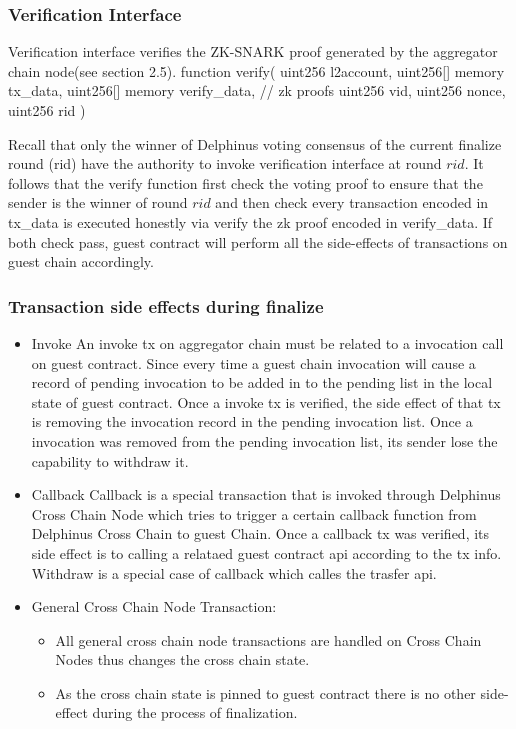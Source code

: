 \documentclass[acmtog, natbib=false]{acmart}
\newenvironment{code}%
   {\snugshade\verbatim}%
   {\endverbatim\endsnugshade}
\begin{document}
\subsubsection{Verification Interface}
Verification interface verifies the ZK-SNARK proof generated by the aggregator chain node(see section 2.5).
\begin{code}
function verify(
  uint256 l2account,
  uint256[] memory tx_data,
  uint256[] memory verify_data, // zk proofs 
  uint256 vid,
  uint256 nonce,
  uint256 rid
)
\end{code}

Recall that only the winner of Delphinus voting consensus of the current finalize round (rid) have the authority to invoke verification interface at round $rid$. It follows that the verify function first check the voting proof to ensure that the sender is the winner of round $rid$ and then check every transaction encoded in tx\_data is executed honestly via verify the zk proof encoded in verify\_data. If both check pass, guest contract will perform all the side-effects of transactions on guest chain accordingly.

\subsubsection{Transaction side effects during finalize}
\begin{itemize}[leftmargin=*]
\item Invoke
    An invoke tx on aggregator chain must be related to a invocation call on guest contract. Since every time a guest chain invocation will cause a record of pending invocation to be added in to the pending list in the local state of guest contract.
    Once a invoke tx is verified, the side effect of that tx is removing the invocation record in the pending invocation list.
    Once a invocation was removed from the pending invocation list, its sender lose the capability to withdraw it.

\item Callback
    Callback is a special transaction that is invoked through Delphinus Cross Chain Node which tries to trigger a certain callback function from Delphinus Cross Chain to guest Chain.
    Once a callback tx was verified, its side effect is to calling a relataed guest contract api according to the tx info.
    Withdraw is a special case of callback which calles the trasfer api.

\item General Cross Chain Node Transaction:
    \begin{itemize}
    \item All general cross chain node transactions are handled on Cross Chain Nodes thus changes the cross chain state.
    \item As the cross chain state is pinned to guest contract there is no other side-effect during the process of finalization.
    \end{itemize}
\end{itemize}
\end{document}
